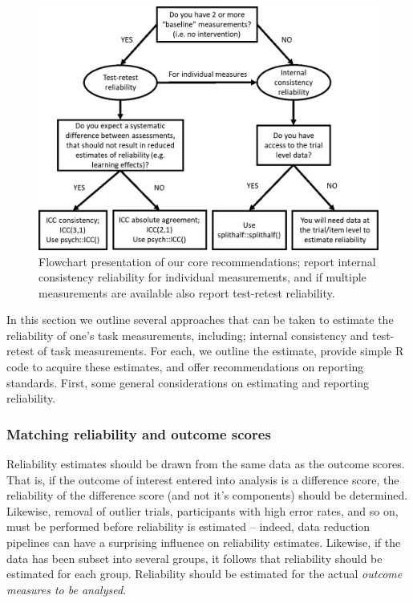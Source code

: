 \documentclass[english,,man,floatsintext]{apa6}
\begin{document}
\begin{figure}[h]

{\centering \includegraphics[width=0.8\linewidth]{fig3} 

}

\caption{Flowchart presentation of our core recommendations; report internal consistency reliability for individual measurements, and if multiple measurements are available also report test-retest reliability.}\label{fig:figthree}
\end{figure}

In this section we outline several approaches that can be taken to estimate the reliability of one's task measurements, including; internal consistency and test-retest of task measurements. For each, we outline the estimate, provide simple R code to acquire these estimates, and offer recommendations on reporting standards. First, some general considerations on estimating and reporting reliability.

\hypertarget{matching-reliability-and-outcome-scores}{%
\subsubsection{Matching reliability and outcome scores}\label{matching-reliability-and-outcome-scores}}

Reliability estimates should be drawn from the same data as the outcome scores. That is, if the outcome of interest entered into analysis is a difference score, the reliability of the difference score (and not it's components) should be determined. Likewise, removal of outlier trials, participants with high error rates, and so on, must be performed before reliability is estimated -- indeed, data reduction pipelines can have a surprising influence on reliability estimates. Likewise, if the data has been subset into several groups, it follows that reliability should be estimated for each group. Reliability should be estimated for the actual \emph{outcome measures to be analysed}.
\end{document}
